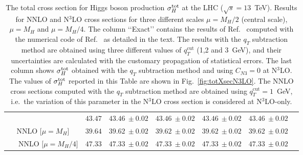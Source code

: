 \documentclass[12pt]{article}
\DeclareRobustCommand{\qt}{q_T}
\DeclareRobustCommand{\qtcut}{\ensuremath{q_T^\mathrm{cut}}}
\begin{document}
\begin{table}
{\begin{tabular}{ |c||c|c|c|c|c|c| }
& $43.47$%

& $43.46~\pm 0.02$

& $43.46~\pm 0.02$

& $43.46~\pm 0.02$ 

& $43.46~\pm 0.02$  \\

\multirow{1}{*}{NNLO  {\scriptsize$\big[\mu=M_{H}\big]$} } 

& $39.64$%

& $39.62~\pm 0.02$ 

& $39.62~\pm 0.02$ 

& $39.62~\pm 0.02$ 

& $39.62~\pm 0.02$ \\

\multirow{1}{*}{~~~NNLO  {\scriptsize$\big[\mu=M_{H}/4\big]$} } 

& $47.33$%

& $47.33~\pm 0.02$  

& $47.33~\pm 0.02$

& $47.33~\pm 0.02$  

& $47.33~\pm 0.02$ \\

\hline

\end{tabular}
}
\caption{\label{Table:totXsec}
{The total cross section for Higgs boson production $\sigma_{H}^{{\rm {tot}}}$ at the LHC ($\sqrt{s}=13$~TeV). Results for NNLO and N$^{3}$LO cross sections for three different scales $\mu=M_{H}/2$ (central scale), $\mu=M_{H}$ and $\mu=M_{H}/4$. The column \lq{}\lq{}Exact\rq{}\rq{} contains the results of Ref.~\cite{Mistlberger:2018etf} computed with the numerical code of Ref.~\cite{Dulat:2018rbf} as detailed in the text. The results with the $\qt$ subtraction method are obtained using three different values of $\qtcut$ (1,2 and 3~GeV), and their uncertainties are calculated with the customary propagation of statistical errors. The last column shows $ \sigma_{H}^{{\rm {tot}}}$ obtained with the $\qt$ subtraction method and using $C_{N3}=0$ at N$^{3}$LO. The values of $ \sigma_{H}^{{\rm {tot}}}$ reported in this Table are shown in Fig.~\ref{fig:totXsecN3LO}. The NNLO cross sections computed with the $\qt$ subtraction method are obtained using $\qtcut=1$~GeV, i.e.\ the variation of this parameter in the N$^{3}$LO cross section is considered at N$^{3}$LO-only.
}
}
\renewcommand{\arraystretch}{1}
\end{table}
\end{document}
